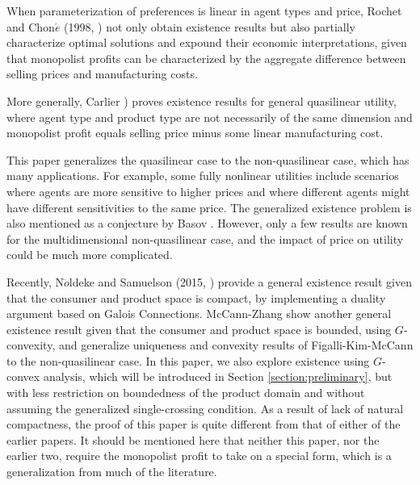 \documentclass[a4paper, 11pt]{amsart}
\numberwithin{equation}{section}
\theoremstyle{plain}
\theoremstyle{definition}
\theoremstyle{remark}
\begin{document}
When parameterization of preferences is linear in agent types and price, Rochet and Chon$\acute{e}$ (1998, \cite{RochetChone98}) not only obtain existence results but also partially characterize optimal solutions and expound their economic interpretations, %
given that monopolist profits can be characterized by {the aggregate difference between selling prices and manufacturing costs.}\medskip

More generally, Carlier \cite{Carlier01}) proves existence results for general quasilinear utility, where agent type and product type are not necessarily of the same dimension and monopolist profit equals selling price minus some linear manufacturing cost.\medskip

This paper generalizes the quasilinear case to the non-quasilinear case, which has many applications. For example, some fully nonlinear utilities include scenarios where agents are more sensitive to higher prices and where different agents might have different sensitivities to the same price. %
The generalized existence problem is also mentioned as a conjecture by Basov \cite[Chapter~8]{Basov05}. However, only a few results are known for the multidimensional non-quasilinear case, and the impact of price on utility could be much more complicated.\medskip


Recently, N$\ddot{o}$ldeke and Samuelson (2015, \cite{NoldekeSamuelson15p}) provide a general existence result given that the consumer and product space is compact, by implementing a duality argument based on Galois Connections. McCann-Zhang \cite{McCannZhang17} show another general existence result given that the consumer and product space is bounded, using $G$-convexity, and generalize uniqueness and convexity results of Figalli-Kim-McCann \cite{FigalliKimMcCann11} to the non-quasilinear case. In this paper, we also explore existence using $G$-convex analysis, which will be introduced in Section \ref{section:preliminary}, but with less restriction on boundedness of the product domain and without assuming the generalized single-crossing condition. As a result of lack of natural compactness, the proof of this paper is quite different from that of either of the %
 earlier papers. It should be mentioned here that {neither} this paper, %
{nor the earlier two}, %
require the monopolist profit to take on a special form, which is a generalization from much of the literature.\medskip
\end{document}
